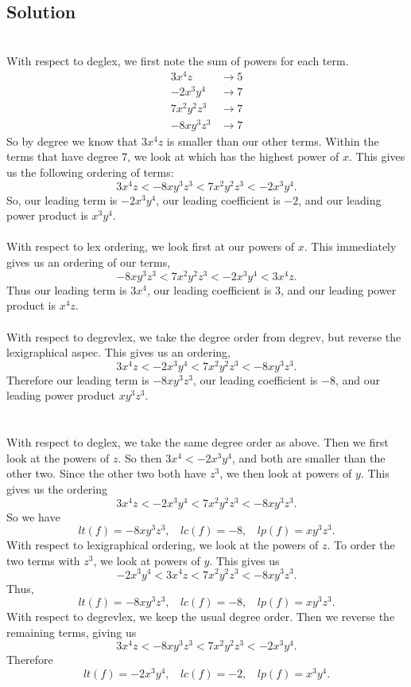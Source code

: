 \documentclass{article}
\theoremstyle{definition}
\begin{document}
\subsection*{Solution}
\\
With respect to deglex, we first note the sum of powers for each term.
\begin{align*}
    3x^4z       &\to 5 \\
    -2x^3y^4    &\to 7 \\
    7x^2y^2z^3  &\to 7 \\
    -8xy^3z^3   &\to 7
\end{align*}
So by degree we know that $3x^4z$ is smaller than our other terms.
Within the terms that have degree 7, we look at which has the highest 
power of $x$. This gives us the following ordering of terms:
\[
    3 x^4 z         <
    -8 x y^3 z^3    <
    7 x^2 y^2 z^3   <
    -2x^3y^4
.\]
So, our leading term is $-2x^3y^4$, our leading coefficient is $-2$, and 
our leading power product is $x^3y^4$.\\\\
With respect to lex ordering, we look first at our powers of $x$. This 
immediately gives us an ordering of our terms,
\[
    -8 x y^3 z^3    <
    7 x^2 y^2 z^3   <
    -2x^3y^4        <
    3 x^4 z
.\]
Thus our leading term is $3x^4$, our leading coefficient is $3$, and our leading 
power product is $x^4z$.\\\\
With respect to degrevlex, we take the degree order from degrev, 
but reverse the lexigraphical aspec. This gives us an ordering,
\[
    3 x^4 z         <
    -2x^3y^4        <
    7 x^2 y^2 z^3   <
    -8 x y^3 z^3
.\]
Therefore our leading term is $-8xy^3z^3$, our leading coefficient is $-8$,
and our leading power product $xy^3z^3$.\\\\
\\
With respect to deglex, we take the same degree order as above.
Then we first look at the powers of $z$. So then $3x^4 < -2x^3y^4$, and 
both are smaller than the other two. Since the other two both have $z^3$,
we then look at powers of $y$. This gives us the ordering 
\[
    3x^4z < -2x^3y^4 < 7x^2y^2z^3 < -8xy^3z^3  
.\]
So we have 
\[
    lt(f) = -8xy^3z^3, \ \ \ \ lc(f) = -8, \ \ \ \ lp(f) = xy^3z^3
.\]
With respect to lexigraphical ordering, we look at the powers of $z$.
To order the two terms with $z^3$, we look at powers of $y$. This gives 
us 
\[
    -2x^3y^4 < 3x^4z < 7x^2y^2z^3 < -8xy^3z^3 
.\]
Thus,
\[
    lt(f) = -8xy^3z^3, \ \ \ \ lc(f) = -8, \ \ \ \ lp(f) = xy^3z^3   
.\]
With respect to degrevlex, we keep the usual degree order. Then we 
reverse the remaining terms, giving us
\[
    3x^4z < -8xy^3z^3 < 7x^2y^2z^3 < -2x^3y^4
.\]
Therefore 
\[
    lt(f) = -2x^3y^4, \ \ \ \ lc(f) = -2, \ \ \ \ lp(f) = x^3y^4
.\]
\end{document}
